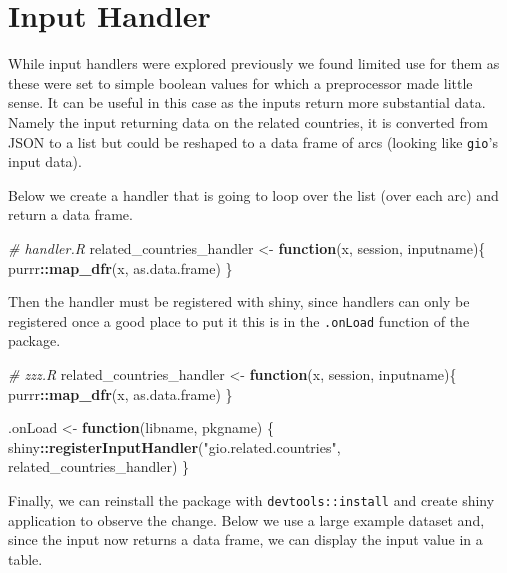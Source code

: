 \documentclass[
]{krantz}
\makeatletter
\newenvironment{Shaded}{\begin{snugshade}}{\end{snugshade}}
\newcommand{\CommentTok}[1]{\textcolor[rgb]{0.37,0.37,0.37}{\textit{#1}}}
\newcommand{\ControlFlowTok}[1]{\textcolor[rgb]{0.27,0.27,0.27}{\textbf{#1}}}
\newcommand{\KeywordTok}[1]{\textcolor[rgb]{0.27,0.27,0.27}{\textbf{#1}}}
\newcommand{\NormalTok}[1]{#1}
\newcommand{\OperatorTok}[1]{\textcolor[rgb]{0.43,0.43,0.43}{\textbf{#1}}}
\newcommand{\StringTok}[1]{\textcolor[rgb]{0.5,0.5,0.5}{#1}}
\newenvironment{kframe}{%
\medskip{}
\setlength{\fboxsep}{.8em}
 \def\at@end@of@kframe{}%
 \ifinner\ifhmode%
  \def\at@end@of@kframe{\end{minipage}}%
  \begin{minipage}{\columnwidth}%
 \fi\fi%
 \def\FrameCommand##1{\hskip\@totalleftmargin \hskip-\fboxsep
 \colorbox{shadecolor}{##1}\hskip-\fboxsep
     \hskip-\linewidth \hskip-\@totalleftmargin \hskip\columnwidth}%
 \MakeFramed {\advance\hsize-\width
   \@totalleftmargin\z@ \linewidth\hsize
   \@setminipage}}%
 {\par\unskip\endMakeFramed%
 \at@end@of@kframe}
\renewenvironment{Shaded}{\begin{kframe}}{\end{kframe}}
\makeatother
\begin{document}
\hypertarget{input-handler}{%
\section{Input Handler}\label{input-handler}}

While input handlers were explored previously we found limited use for them as these were set to simple boolean values for which a preprocessor made little sense. It can be useful in this case as the inputs return more substantial data. Namely the input returning data on the related countries, it is converted from JSON to a list but could be reshaped to a data frame of arcs (looking like \texttt{gio}'s input data).

Below we create a handler that is going to loop over the list (over each arc) and return a data frame.

\begin{Shaded}
\begin{Highlighting}[]
\CommentTok{\# handler.R}
\NormalTok{related\_countries\_handler <{-}}\StringTok{ }\ControlFlowTok{function}\NormalTok{(x, session, inputname)\{}
\NormalTok{  purrr}\OperatorTok{::}\KeywordTok{map\_dfr}\NormalTok{(x, as.data.frame)}
\NormalTok{\}}
\end{Highlighting}
\end{Shaded}

Then the handler must be registered with shiny, since handlers can only be registered once a good place to put it this is in the \texttt{.onLoad} function of the package.

\begin{Shaded}
\begin{Highlighting}[]
\CommentTok{\# zzz.R}
\NormalTok{related\_countries\_handler <{-}}\StringTok{ }\ControlFlowTok{function}\NormalTok{(x, session, inputname)\{}
\NormalTok{  purrr}\OperatorTok{::}\KeywordTok{map\_dfr}\NormalTok{(x, as.data.frame)}
\NormalTok{\}}

\NormalTok{.onLoad <{-}}\StringTok{ }\ControlFlowTok{function}\NormalTok{(libname, pkgname) \{}
\NormalTok{  shiny}\OperatorTok{::}\KeywordTok{registerInputHandler}\NormalTok{(}\StringTok{"gio.related.countries"}\NormalTok{, related\_countries\_handler)}
\NormalTok{\}}
\end{Highlighting}
\end{Shaded}

Finally, we can reinstall the package with \texttt{devtools::install} and create shiny application to observe the change. Below we use a large example dataset and, since the input now returns a data frame, we can display the input value in a table.
\end{document}

